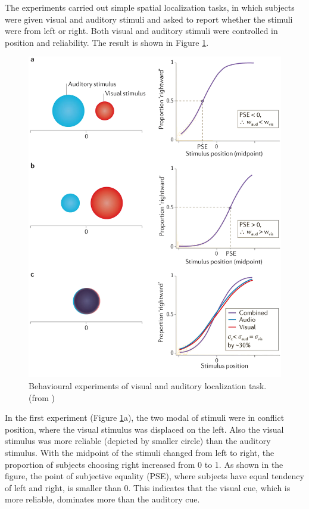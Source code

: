\documentclass{article}[11pt]
\begin{document}
The experiments carried out simple spatial localization tasks, in which subjects were given visual and auditory stimuli and asked to report whether the stimuli were from left or right. Both visual and auditory stimuli were controlled in position and reliability. The result is shown in Figure \ref{fig:visaudloc}.

\begin{figure}[htpb]
  \centering
  \includegraphics[width=.9\textwidth]{fetsch-visaudloc}
  \caption{Behavioural experiments of visual and auditory localization task. (from \cite{fetsch_bridging_2013})}
  \label{fig:visaudloc}
\end{figure}

In the first experiment (Figure \ref{fig:visaudloc}a), the two modal of stimuli were in conflict position, where the visual stimulus was displaced on the left. Also the visual stimulus was more reliable (depicted by smaller circle) than the auditory stimulus. With the midpoint of the stimuli changed from left to right, the proportion of subjects choosing right increased from 0 to 1. As shown in the figure, the point of subjective equality (PSE), where subjects have equal tendency of left and right, is smaller than 0. This indicates that the visual cue, which is more reliable, dominates more than the auditory cue.
\end{document}
